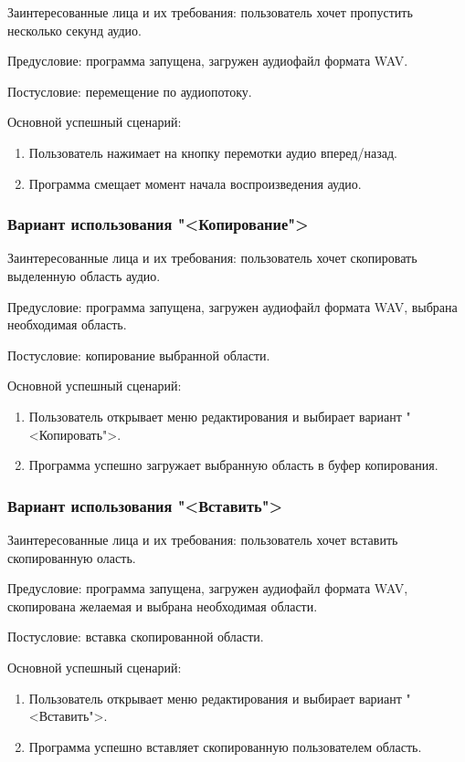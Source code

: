 Заинтересованные лица и их требования: пользователь хочет пропустить несколько секунд аудио.

Предусловие: программа запущена, загружен аудиофайл формата WAV.

Постусловие: перемещение по аудиопотоку.

Основной успешный сценарий:
\begin{enumerate}
	\item Пользователь нажимает на кнопку перемотки аудио вперед/назад.
	\item Программа смещает момент начала воспроизведения аудио.
\end{enumerate} 

\subsubsection{Вариант использования "<Копирование">}

Заинтересованные лица и их требования: пользователь хочет скопировать выделенную область аудио.

Предусловие: программа запущена, загружен аудиофайл формата WAV, выбрана необходимая область.

Постусловие: копирование выбранной области.

Основной успешный сценарий:
\begin{enumerate}
	\item Пользователь открывает меню редактирования и выбирает вариант "<Копировать">.
	\item Программа успешно загружает выбранную область в буфер копирования.
\end{enumerate} 

\subsubsection{Вариант использования "<Вставить">}

Заинтересованные лица и их требования: пользователь хочет вставить скопированную оласть.

Предусловие: программа запущена, загружен аудиофайл формата WAV, скопирована желаемая и выбрана необходимая области.

Постусловие: вставка скопированной области.

Основной успешный сценарий:
\begin{enumerate}
	\item Пользователь открывает меню редактирования и выбирает вариант "<Вставить">.
	\item Программа успешно вставляет скопированную пользователем область.
\end{enumerate} 

